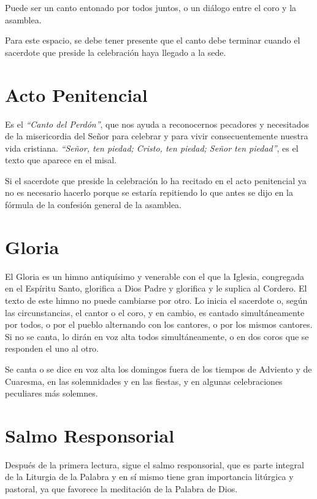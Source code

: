 \documentclass[letterpaper, 12pt]{book}
\begin{document}
    Puede ser un canto entonado por todos juntos, o un diálogo entre el coro y la asamblea.\newline
    
    Para este espacio, se debe tener presente que el canto debe terminar cuando el sacerdote que preside la celebración haya llegado a la sede.
    
    \section{Acto Penitencial}
    Es el \textit{``Canto del Perd\'on''}, que nos ayuda a reconocernos pecadores y necesitados de la misericordia del Se\~nor para celebrar y para vivir consecuentemente nuestra vida cristiana. \textit{``Se\~nor, ten piedad; Cristo, ten piedad; Se\~nor ten piedad''}, es el texto que aparece en el misal.\newline
    
    Si el sacerdote que preside la celebraci\'on lo ha recitado en el acto penitencial ya no es necesario hacerlo porque se estar\'ia repitiendo lo que antes se dijo en la f\'ormula de la confesi\'on general de la asamblea.
    
    \section{Gloria}
    El Gloria es un himno antiqu\'isimo y venerable con el que la Iglesia, congregada en el Esp\'iritu Santo, glorifica a Dios Padre y glorifica y le suplica al Cordero. El texto de este himno no puede cambiarse por otro. Lo inicia el sacerdote o, seg\'un las circunstancias, el cantor o el coro, y en cambio, es cantado simult\'aneamente por todos, o por el pueblo alternando con los cantores, o por los mismos cantores. Si no se canta, lo dir\'an en voz alta todos simult\'aneamente, o en dos coros que se responden el uno al otro.\newline
    
    Se canta o se dice en voz alta los domingos fuera de los tiempos de Adviento y de Cuaresma, en las solemnidades y en las fiestas, y en algunas celebraciones peculiares m\'as solemnes.
    
    \section{Salmo Responsorial}
    Despu\'es de la primera lectura, sigue el salmo responsorial, que es parte integral de la Liturgia de la Palabra y en s\'i mismo tiene gran importancia lit\'urgica y pastoral, ya que favorece la meditaci\'on de la Palabra de Dios.\newline
    
\end{document}
